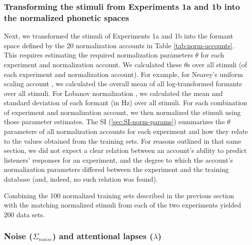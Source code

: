 \documentclass[preprint]{JASA}
\begin{document}
\subsubsection{Transforming the stimuli from Experiments 1a and 1b into the normalized phonetic spaces}\label{transforming-the-stimuli-from-experiments-1a-and-1b-into-the-normalized-phonetic-spaces}

Next, we transformed the stimuli of Experiments 1a and 1b into the formant space defined by the 20 normalization accounts in Table \ref{tab:norm-accounts}. This requires estimating the required normalization parameters \(\theta\) for each experiment and normalization account. We calculated these \(\theta\)s over all stimuli (of each experiment and normalization account). For example, for Nearey's uniform scaling account \citep{nearey1978}, we calculated the overall mean of all log-transformed formants over all stimuli. For Lobanov normalization \citep{lobanov1971}, we calculated the mean and standard deviation of each formant (in Hz) over all stimuli. For each combination of experiment and normalization account, we then normalized the stimuli using those parameter estimates. The SI (\ref{sec:SI-norm-params}) summarizes the \(\theta\) parameters of all normalization accounts for each experiment and how they relate to the values obtained from the training sets. For reasons outlined in that same section, we did not expect a clear relation between an account's ability to predict listeners' responses for an experiment, and the degree to which the account's normalization parameters differed between the experiment and the training database (and, indeed, no such relation was found).

Combining the 100 normalized training sets described in the previous section with the matching normalized stimuli from each of the two experiments yielded 200 data sets.

\subsubsection{\texorpdfstring{Noise (\(\Sigma_{noise}\)) and attentional lapses (\(\lambda\))}{Noise (\textbackslash Sigma\_\{noise\}) and attentional lapses (\textbackslash lambda)}}\label{noise-sigma_noise-and-attentional-lapses-lambda}
\end{document}
